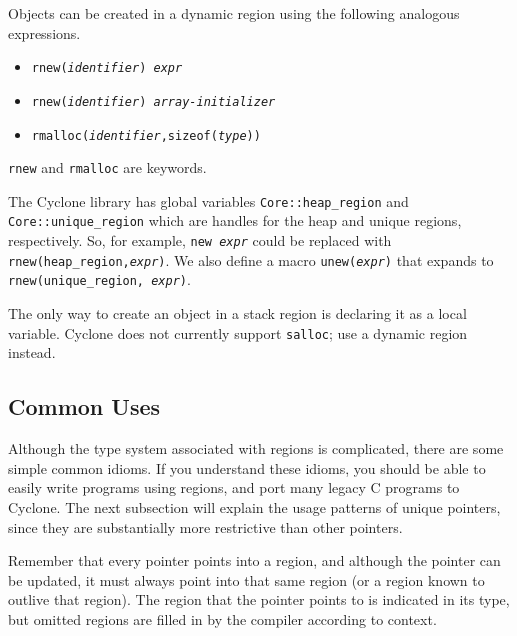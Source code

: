 Objects can be created in a dynamic region using the following analogous
expressions.
\begin{itemize}
\item \texttt{rnew({\it identifier}) {\it expr}}
\item \texttt{rnew({\it identifier}) {\it array-initializer}}
\item \texttt{rmalloc({\it identifier},sizeof({\it type}))}
\end{itemize}
\texttt{rnew} and \texttt{rmalloc} are keywords.

The Cyclone library has global variables \texttt{Core::heap_region} and
\texttt{Core::unique_region} which are handles for the heap and unique
regions, respectively.  So, for example, \texttt{new {\it expr}} could be
replaced with \texttt{rnew(heap_region,{\it expr})}.  We also define a macro
\texttt{unew({\it expr})} that expands to \texttt{rnew(unique_region,{\it
expr})}.

The only way to create an object in a stack region is declaring it as
a local variable.  Cyclone does not currently support \texttt{salloc};
use a dynamic region instead.

\subsection{Common Uses}
\label{sec:common-use}

Although the type system associated with regions is complicated, there are
some simple common idioms.  If you understand these idioms, you should be
able to easily write programs using regions, and port many legacy C programs
to Cyclone.  The next subsection will explain the usage patterns of unique
pointers, since they are substantially more restrictive than other pointers.

Remember that every pointer points into a region, and although the
pointer can be updated, it must always point into that same region (or
a region known to outlive that region).  The region that the pointer
points to is indicated in its type, but omitted regions are filled in
by the compiler according to context.


